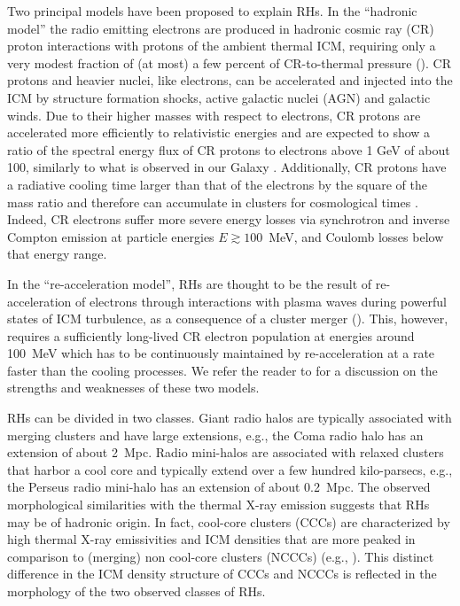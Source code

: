 \documentclass[useAMS,usenatbib]{mn2e}
\begin{document}
Two principal models have been proposed to explain RHs.  In the ``hadronic
model'' the radio emitting electrons are produced in hadronic cosmic ray (CR)
proton interactions with protons of the ambient thermal ICM, requiring only a
very modest fraction of (at most) a few percent of CR-to-thermal pressure
(\citealp{1980ApJ...239L..93D,1982AJ.....87.1266V, 1999APh....12..169B,
  2000A&A...362..151D, 2001ApJ...562..233M,2001ApJ...559...59M,
  2003MNRAS.342.1009M,2003A&A...407L..73P, 2004A&A...413...17P,
  2004MNRAS.352...76P, 2007IJMPA..22..681B, 2008MNRAS.385.1211P,
  2008MNRAS.385.1242P, 2009JCAP...09..024K, 2010MNRAS.401...47D,
  2010arXiv1003.0336D, 2010arXiv1003.1133K, 2010arXiv1011.0729K,
  2011A&A...527A..99E}).  CR protons and heavier nuclei, like electrons, can be
accelerated and injected into the ICM by structure formation shocks, active
galactic nuclei (AGN) and galactic winds.  Due to their higher masses with
respect to electrons, CR protons are accelerated more efficiently to
relativistic energies and are expected to show a ratio of the spectral energy
flux of CR protons to electrons above 1 GeV of about 100, similarly to what is
observed in our Galaxy \citep{2002cra..book.....S}. Additionally, CR protons
have a radiative cooling time larger than that of the electrons by the square of
the mass ratio and therefore can accumulate in clusters for cosmological times
\citep{1996SSRv...75..279V}. Indeed, CR electrons suffer more severe energy
losses via synchrotron and inverse Compton emission at particle energies $E
\gtrsim 100$~MeV, and Coulomb losses below that energy range.

In the ``re-acceleration model'', RHs are thought to be the result of
re-acceleration of electrons through interactions with plasma waves during
powerful states of ICM turbulence, as a consequence of a cluster merger
(\citealp{1987A&A...182...21S, 1993ApJ...406..399G, 2002A&A...386..456G,
  2004MNRAS.350.1174B, 2005MNRAS.363.1173B, 2007MNRAS.378..245B,
  2010arXiv1008.0184B, 2009A&A...507..661B, 2012arXiv1211.3337D}). This,
however, requires a sufficiently long-lived CR electron population at energies
around 100~MeV which has to be continuously maintained by re-acceleration at a
rate faster than the cooling processes.  We refer the reader to
\citet{2011A&A...527A..99E} for a discussion on the strengths and weaknesses of
these two models.

RHs can be divided in two classes. Giant radio halos are typically associated
with merging clusters and have large extensions, e.g., the Coma radio halo has
an extension of about 2~Mpc. Radio mini-halos are associated with relaxed
clusters that harbor a cool core and typically extend over a few hundred
kilo-parsecs, e.g., the Perseus radio mini-halo has an extension of about
0.2~Mpc.  The observed morphological similarities with the thermal X-ray
emission suggests that RHs may be of hadronic origin. In fact, cool-core
clusters (CCCs) are characterized by high thermal X-ray emissivities and ICM
densities that are more peaked in comparison to (merging) non cool-core clusters
(NCCCs) (e.g., \citealp{2008A&A...487..431C}). This distinct difference in the
ICM density structure of CCCs and NCCCs is reflected in the morphology of the
two observed classes of RHs.
\end{document}

